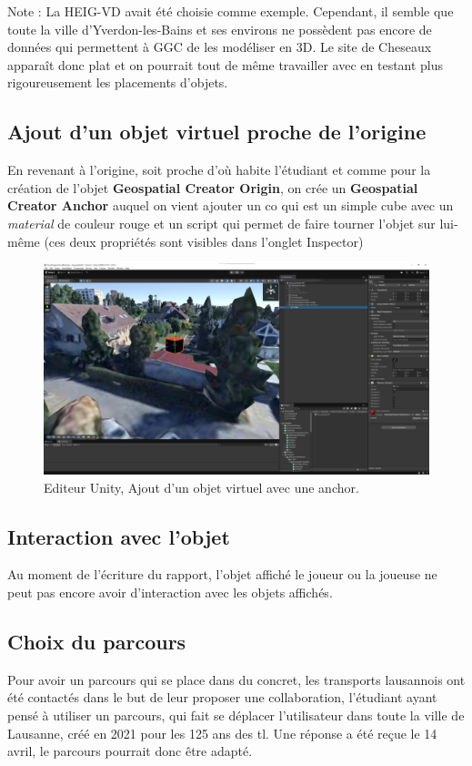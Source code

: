 Note : La HEIG-VD avait été choisie comme exemple. Cependant, il semble que toute la ville d'Yverdon-les-Bains et ses environs ne possèdent pas encore
de données qui permettent à GGC de les modéliser en 3D. Le site de Cheseaux apparaît donc plat et on pourrait tout de même travailler avec
en testant plus rigoureusement les placements d'objets.

\subsection{Ajout d'un objet virtuel proche de l'origine}\label{AddObject}
En revenant à l'origine, soit proche d'où habite l'étudiant et comme pour la création de l'objet
\textbf{Geospatial Creator Origin}, on crée un \textbf{Geospatial Creator Anchor} auquel on vient ajouter un \acrshort{co}
qui est un simple cube avec un \textit{material} de couleur rouge et un script  qui permet de faire tourner l'objet sur lui-même (ces deux propriétés sont visibles dans l'onglet Inspector)

\begin{figure}[H]
    \centering
    \includegraphics[width=1\linewidth]{assets/figures/Screenshots/GGC_3.png}
    \caption{Editeur Unity, Ajout d'un objet virtuel avec une anchor.}
    \label{fig:GGC_3}
\end{figure}


\subsection{Interaction avec l'objet}
Au moment de l'écriture du rapport, l'objet affiché le joueur ou la joueuse ne peut pas encore avoir d'interaction avec les objets affichés.
\subsection{Choix du parcours}
Pour avoir un parcours qui se place dans du concret, les transports lausannois
ont été contactés dans le but de leur proposer une collaboration, l'étudiant ayant pensé à
utiliser un parcours, qui fait se déplacer l'utilisateur dans toute la ville de Lausanne,
créé en 2021 pour les 125 ans des tl.\cite{hatetVeriteLionsLausannois2021} Une réponse a été reçue le 14 avril, le parcours pourrait donc
être adapté.

